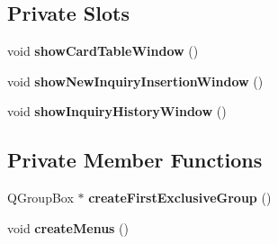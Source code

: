 \subsection*{Private Slots}
\begin{DoxyCompactItemize}
\item 
\mbox{\label{classMainWindow_a13da86828ec8b4e3ba580622dd135528}} 
void {\bfseries show\+Card\+Table\+Window} ()
\item 
\mbox{\label{classMainWindow_a7b79d1f6418bd9e683cae4ace4e50927}} 
void {\bfseries show\+New\+Inquiry\+Insertion\+Window} ()
\item 
\mbox{\label{classMainWindow_a6fa1b21721625180a1b7bf3b93ddf856}} 
void {\bfseries show\+Inquiry\+History\+Window} ()
\end{DoxyCompactItemize}
\subsection*{Private Member Functions}
\begin{DoxyCompactItemize}
\item 
\mbox{\label{classMainWindow_a9f855fe5218322da2263da11b5fd55e6}} 
Q\+Group\+Box $\ast$ {\bfseries create\+First\+Exclusive\+Group} ()
\item 
\mbox{\label{classMainWindow_aa4907b0251d305659e403c62921ef331}} 
void {\bfseries create\+Menus} ()
\end{DoxyCompactItemize}
